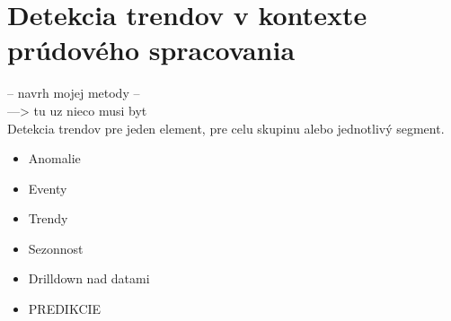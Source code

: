 \chapter{Detekcia trendov v kontexte prúdového spracovania}
\label{Detekcia trendov v kontexte prúdového spracovania}

-- navrh mojej metody -- \\
---> tu uz nieco musi byt\\
Detekcia trendov pre jeden element, pre celu skupinu alebo jednotlivý segment.

\begin{itemize}
	\item Anomalie
	\item Eventy
	\item Trendy
	\item Sezonnost
	\item Drilldown nad datami
	\item PREDIKCIE
\end{itemize}